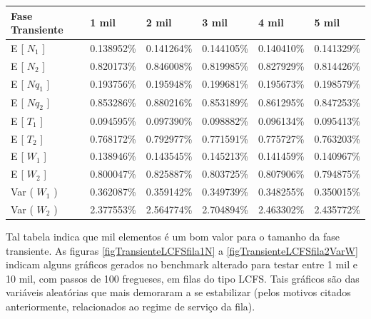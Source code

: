 \documentclass[a4paper,10pt]{article}
\begin{document}
\begin{center}
\begin{tabular} { | l | l | l | l | l | l | }
    \hline
    Fase Transiente & 1 mil      & 2 mil      & 3 mil      & 4 mil      & 5 mil     \\ \hline
    E [ $N_1$ ]     & 0.138952\% & 0.141264\% & 0.144105\% & 0.140410\% & 0.141329\% \\ \hline
    E [ $N_2$ ]     & 0.820173\% & 0.846008\% & 0.819985\% & 0.827929\% & 0.814426\% \\ \hline
    E [ $Nq_1$ ]    & 0.193756\% & 0.195948\% & 0.199681\% & 0.195673\% & 0.198579\% \\ \hline
    E [ $Nq_2$ ]    & 0.853286\% & 0.880216\% & 0.853189\% & 0.861295\% & 0.847253\% \\ \hline
    E [ $T_1$ ]     & 0.094595\% & 0.097390\% & 0.098882\% & 0.096134\% & 0.095413\% \\ \hline
    E [ $T_2$ ]     & 0.768172\% & 0.792977\% & 0.771591\% & 0.775727\% & 0.763203\% \\ \hline
    E [ $W_1$ ]     & 0.138946\% & 0.143545\% & 0.145213\% & 0.141459\% & 0.140967\% \\ \hline
    E [ $W_2$ ]     & 0.800047\% & 0.825887\% & 0.803725\% & 0.807906\% & 0.794875\% \\ \hline
    Var ( $W_1$ )   & 0.362087\% & 0.359142\% & 0.349739\% & 0.348255\% & 0.350015\% \\ \hline
    Var ( $W_2$ )   & 2.377553\% & 2.564774\% & 2.704894\% & 2.463302\% & 2.435772\% \\ \hline
\end{tabular}
\end{center}

    Tal tabela indica que mil elementos é um bom valor para o tamanho da fase transiente. As figuras \ref{figTransienteLCFSfila1N} a \ref{figTransienteLCFSfila2VarW} indicam alguns gráficos gerados no benchmark alterado para testar entre 1 mil e 10 mil, com passos de 100 fregueses, em filas do tipo LCFS. Tais gráficos são das variáveis aleatórias que mais demoraram a se estabilizar (pelos motivos citados anteriormente, relacionados ao regime de serviço da fila).

\pagebreak
\end{document}
